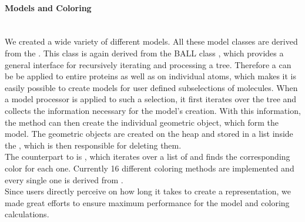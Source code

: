\paragraph{Models and Coloring}
\hspace*{\fill}\\
We created a wide variety of different models.
All these model classes are derived from the .
This class is again derived from the BALL class , 
which provides a general interface for recursively iterating and processing a 
 tree.
Therefore a  can be be applied to entire proteins as well as on 
individual atoms, which makes it is easily possible to create models for user defined 
subselections of molecules.
When a model processor is applied to such a selection, it first iterates over the
 tree and collects the information necessary for the model's creation.
With this information, the method  can then create the 
individual geometric object, which form the model. 
The geometric objects are created on the heap and stored in a list inside the 
, which is then responsible for deleting them.
\\
The counterpart to  is , which iterates over a 
list of  and finds the corresponding color for each one.
Currently 16 different coloring methods are implemented and
every single one is derived from .
\\
Since users directly perceive on how long it takes to create a representation,
we made great efforts to ensure maximum performance for the model and coloring 
calculations.

